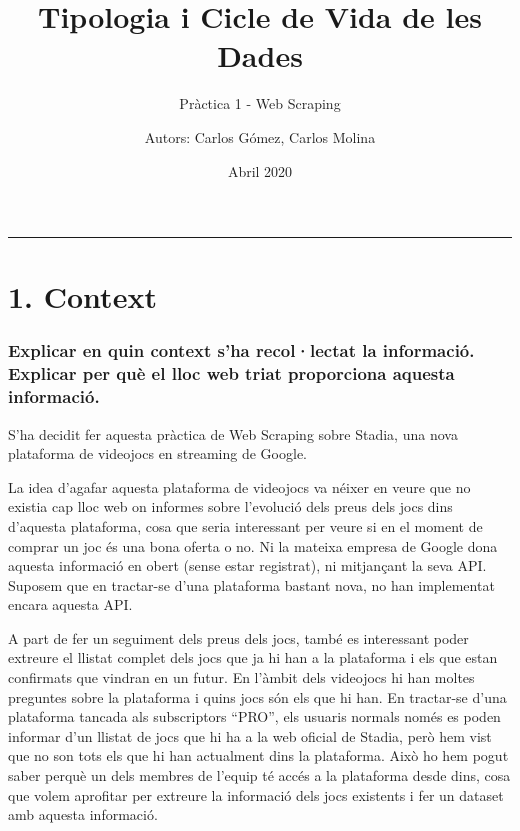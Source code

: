 \documentclass[]{article}
\title{Tipologia i Cicle de Vida de les Dades}
\subtitle{Pràctica 1 - Web Scraping}
\author{Autors: Carlos Gómez, Carlos Molina}
\date{Abril 2020}
\begin{document}
\maketitle

{
\setcounter{tocdepth}{1}
\tableofcontents
}
\begin{center}\rule{0.5\linewidth}{\linethickness}\end{center}

\hypertarget{context}{%
\section{1. Context}\label{context}}

\hypertarget{explicar-en-quin-context-sha-recollectat-la-informaciuxf3.-explicar-per-quuxe8-el-lloc-web-triat-proporciona-aquesta-informaciuxf3.}{%
\subsubsection{Explicar en quin context s'ha recol·lectat la informació.
Explicar per què el lloc web triat proporciona aquesta
informació.}\label{explicar-en-quin-context-sha-recollectat-la-informaciuxf3.-explicar-per-quuxe8-el-lloc-web-triat-proporciona-aquesta-informaciuxf3.}}

S'ha decidit fer aquesta pràctica de Web Scraping sobre Stadia, una nova
plataforma de videojocs en streaming de Google.

La idea d'agafar aquesta plataforma de videojocs va néixer en veure que
no existia cap lloc web on informes sobre l'evolució dels preus dels
jocs dins d'aquesta plataforma, cosa que seria interessant per veure si
en el moment de comprar un joc és una bona oferta o no. Ni la mateixa
empresa de Google dona aquesta informació en obert (sense estar
registrat), ni mitjançant la seva API. Suposem que en tractar-se d'una
plataforma bastant nova, no han implementat encara aquesta API.

A part de fer un seguiment dels preus dels jocs, també es interessant
poder extreure el llistat complet dels jocs que ja hi han a la
plataforma i els que estan confirmats que vindran en un futur. En
l'àmbit dels videojocs hi han moltes preguntes sobre la plataforma i
quins jocs són els que hi han. En tractar-se d'una plataforma tancada
als subscriptors ``PRO'', els usuaris normals només es poden informar
d'un llistat de jocs que hi ha a la web oficial de Stadia, però hem vist
que no son tots els que hi han actualment dins la plataforma. Això ho
hem pogut saber perquè un dels membres de l'equip té accés a la
plataforma desde dins, cosa que volem aprofitar per extreure la
informació dels jocs existents i fer un dataset amb aquesta informació.
\end{document}
